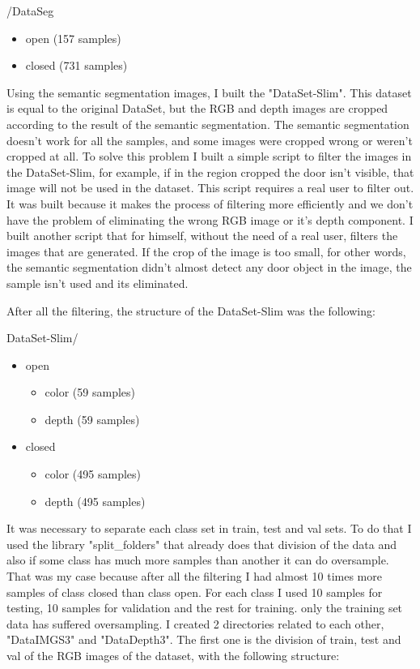     /DataSeg
    \begin{itemize}
        \item open   (157 samples)
        \item closed (731 samples)
    \end{itemize}   
    
    Using the semantic segmentation images, I built the "DataSet-Slim". This dataset is equal to the original DataSet, but the RGB and depth images are cropped according to the result of the semantic segmentation. The semantic segmentation doesn't work for all the samples, and some images were cropped wrong or weren't cropped at all. To solve this problem I built a simple script to filter the images in the DataSet-Slim, for example, if in the region cropped the door isn't visible, that image will not be used in the dataset. This script requires a real user to filter out. It was built because it makes the process of filtering more efficiently and we don't have the problem of eliminating the wrong RGB image or it's depth component. I built another script that for himself, without the need of a real user, filters the images that are generated. If the crop of the image is too small, for other words, the semantic segmentation didn't almost detect any door object in the image, the sample isn't used and its eliminated.

    After all the filtering, the structure of the DataSet-Slim was the following:
    
    \bigskip
    DataSet-Slim/
    \begin{itemize}
        \item open
        \begin{itemize}
            \item color (59 samples)
            \item depth (59 samples)
        \end{itemize}
        \item closed
        \begin{itemize}
            \item color (495 samples)
            \item depth (495 samples)
        \end{itemize}
    \end{itemize}

    It was necessary to separate each class set in train, test and val sets. To do that I used the library "split\_folders" that already does that division of the data and also if some class has much more samples than another it can do oversample. That was my case because after all the filtering I had almost 10 times more samples of class closed than class open. For each class I used 10 samples for testing, 10 samples for validation and the rest for training. only the training set data has suffered oversampling. I created 2 directories related to each other, "DataIMGS3" and "DataDepth3". The first one is the division of train, test and val of the RGB images of the dataset, with the following structure:
    
